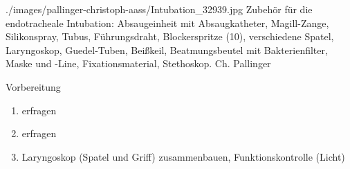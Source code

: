 \documentclass[
ngerman,
paper=a4,
asymmetric,
fontsize=8pt,
draft=false,
numbers=noenddot,
bibtotocnumbered,
footnotes=multiple,
toc=flat,
]{scrbook}
\begin{document}
{}
{}
{./images/pallinger-christoph-aass/Intubation_32939.jpg}
{Zubehör für die endotracheale Intubation: Absaugeinheit
mit Absaugkatheter, Magill-Zange, Silikonspray, Tubus,
Führungsdraht, Blockerspritze (10\Ml*), verschiedene Spatel,
Laryngoskop, Guedel-Tuben, Beißkeil, Beatmungsbeutel mit
Bakterienfilter, Maske und -Line, Fixationsmaterial,
Stethoskop.}
{Ch.
Pallinger}

\clearpage




\begin{ProcedureStepsWide}{Vorbereitung}
\begin{enumerate}
  \item {} erfragen
  \item {} erfragen
  \item {} Laryngoskop (Spatel und
  Griff) zusammenbauen, Funktionskontrolle (Licht)
  

\end{enumerate}
\end{ProcedureStepsWide}
\end{document}
